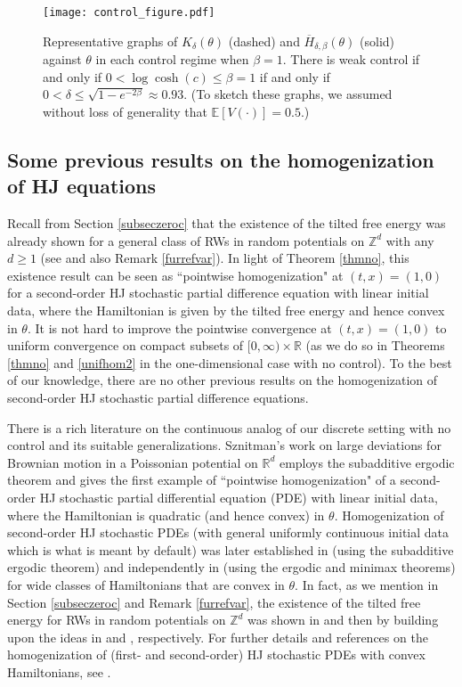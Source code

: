 \documentclass[a4paper]{amsart}
\numberwithin{equation}{section}
\theoremstyle{plain}
\theoremstyle{remark}
\begin{document}
\begin{figure}
\texttt{[image: control\_figure.pdf]}
\caption{Representative graphs of $K_\delta(\theta)$ (dashed) and $\overline H_{\delta,\beta}(\theta)$ (solid) against $\theta$ in each control regime when $\beta = 1$. There is weak control if and only if $0<\log\cosh(c)\le\beta = 1$ if and only if $0<\delta\le\sqrt{1 - e^{-2\beta}}\approx 0.93$. (To sketch these graphs, we assumed without loss of generality that $\mathbb{E}[V(\cdot)] = 0.5$.)}
\label{matrixfigure}
\end{figure}

\subsection{Some previous results on the homogenization of HJ equations}\label{syurdubey}

Recall from Section \ref{subseczeroc} that the existence of the tilted free energy was already shown for a general class of RWs in random potentials on $\mathbb{Z}^d$ with any $d\ge1$ (see \cite{Zer1998,Flu2007,Yil2009,RasSepYil2013} and also Remark \ref{furrefvar}). In light of Theorem \ref{thmno}, this existence result can be seen as ``pointwise homogenization" at $(t,x)=(1,0)$ for a second-order HJ stochastic partial difference equation with linear initial data, where the Hamiltonian is given by the tilted free energy and hence convex in $\theta$. It is not hard to improve the pointwise convergence at $(t,x)=(1,0)$ to uniform convergence on compact subsets of $[0,\infty)\times\mathbb{R}$ (as we do so in Theorems \ref{thmno} and \ref{unifhom2} in the one-dimensional case with no control). To the best of our knowledge, there are no other previous results on the homogenization of second-order HJ stochastic partial difference equations.

There is a rich literature on the continuous analog of our discrete setting with no control and its suitable generalizations. Sznitman's work \cite{Szn1994} on large deviations for Brownian motion in a Poissonian potential on $\mathbb{R}^d$ employs the subadditive ergodic theorem and gives the first example of ``pointwise homogenization" of a second-order HJ stochastic partial differential equation (PDE) with linear initial data, where the Hamiltonian is quadratic (and hence convex) in $\theta$. Homogenization of second-order HJ stochastic PDEs (with general uniformly continuous initial data which is what is meant by default) was later established in \cite{LioSou2005} (using the subadditive ergodic theorem) and independently in \cite{KosRezVar2006} (using the ergodic and minimax theorems) for wide classes of Hamiltonians that are convex in $\theta$. In fact, as we mention in Section \ref{subseczeroc} and Remark \ref{furrefvar}, the existence of the tilted free energy for RWs in random potentials on $\mathbb{Z}^d$ was shown in \cite{Zer1998,Flu2007} and then \cite{Yil2009,RasSepYil2013} by building upon the ideas in \cite{Szn1994} and \cite{KosRezVar2006}, respectively. For further details and references on the homogenization of (first- and second-order) HJ stochastic PDEs with convex Hamiltonians, see \cite{Kos2007}.
\end{document}
